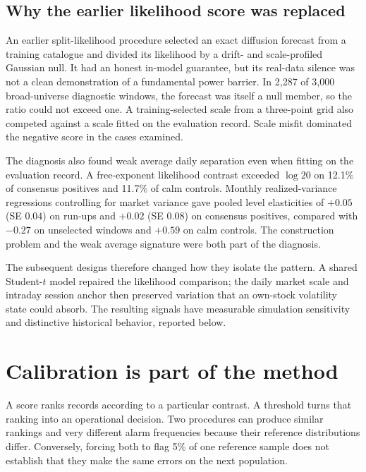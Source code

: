 \subsection{Why the earlier likelihood score was replaced}
An earlier split-likelihood procedure selected an exact diffusion forecast
from a training catalogue and divided its likelihood by a drift- and
scale-profiled Gaussian null. It had an honest in-model guarantee, but its
real-data silence was not a clean demonstration of a fundamental power
barrier. In 2,287 of 3,000 broad-universe diagnostic windows, the forecast was
itself a null member, so the ratio could not exceed one. A training-selected
scale from a three-point grid also competed against a scale fitted on the
evaluation record. Scale misfit dominated the negative score in the cases
examined.

The diagnosis also found weak average daily separation even when fitting
on the evaluation record. A free-exponent likelihood contrast exceeded
$\log 20$ on 12.1\% of consensus positives and 11.7\% of calm controls.
Monthly realized-variance regressions controlling for market variance gave
pooled level elasticities of $+0.05$ (SE $0.04$) on run-ups and $+0.02$
(SE $0.08$) on consensus positives, compared with $-0.27$ on unselected
windows and $+0.59$ on calm controls. The construction problem and the weak
average signature were both part of the diagnosis.

The subsequent designs therefore changed how they isolate the pattern.
A shared Student-$t$ model repaired the likelihood comparison; the daily
market scale and intraday session anchor then preserved variation that an
own-stock volatility state could absorb. The resulting signals have
measurable simulation sensitivity and distinctive historical behavior,
reported below.

\section{Calibration is part of the method}\label{sec:calibration}
A score ranks records according to a particular contrast. A threshold turns
that ranking into an operational decision. Two procedures can produce
similar rankings and very different alarm frequencies because their
reference distributions differ. Conversely, forcing both to flag 5\% of one
reference sample does not establish that they make the same errors on the
next population.

